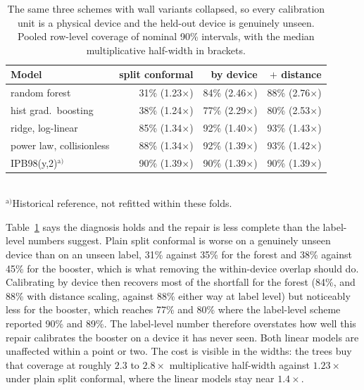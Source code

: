 \documentclass[12pt,letterpaper]{article}
\begin{document}
\begin{table}[!htbp]
\centering
\small
\caption{The same three schemes with wall variants collapsed, so every
calibration unit is a physical device and the held-out device is genuinely
unseen. Pooled row-level coverage of nominal 90\% intervals, with the median
multiplicative half-width in brackets.}
\label{tab:supdevice}
\begin{tabular}{lrrr}
\toprule
Model & split conformal & by device & $+$ distance \\
\midrule
random forest            & 31\% (1.23$\times$) & 84\% (2.46$\times$) & 88\% (2.76$\times$) \\
hist grad.\ boosting     & 38\% (1.24$\times$) & 77\% (2.29$\times$) & 80\% (2.53$\times$) \\
ridge, log-linear        & 85\% (1.34$\times$) & 92\% (1.40$\times$) & 93\% (1.43$\times$) \\
power law, collisionless & 88\% (1.34$\times$) & 92\% (1.39$\times$) & 93\% (1.42$\times$) \\
IPB98(y,2)$^{\mathrm{a)}}$ & 90\% (1.39$\times$) & 90\% (1.39$\times$) & 90\% (1.39$\times$) \\
\bottomrule
\end{tabular}
\\[2pt]
{\footnotesize $^{\mathrm{a)}}$Historical reference, not refitted within these folds.}
\par\smallskip{}
\end{table}

Table~\ref{tab:supdevice} says the diagnosis holds and the repair is less complete
than the label-level numbers suggest. Plain split conformal is worse on a
genuinely unseen device than on an unseen label, 31\% against 35\% for the
forest and 38\% against 45\% for the booster, which is what removing the
within-device overlap should do. Calibrating by device then recovers most of
the shortfall for the forest (84\%, and 88\% with distance scaling, against
88\% either way at label level) but noticeably less for the booster, which
reaches 77\% and 80\% where the label-level scheme reported 90\% and 89\%. The
label-level number therefore overstates how well this repair calibrates the
booster on a device it has never seen. Both linear models are unaffected within
a point or two. The cost is visible in the widths: the trees buy that coverage
at roughly $2.3$ to $2.8\times$ multiplicative half-width against $1.23\times$
under plain split conformal, where the linear models stay near $1.4\times$.
\end{document}
